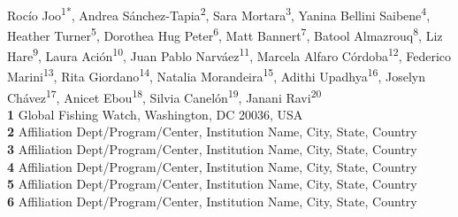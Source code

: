 \documentclass[10pt,letterpaper]{article}
\begin{document}
\newcommand{\fede}[1]{\textcolor{ForestGreen}{Fede: #1}}
\newcommand{\rocio}[1]{\textcolor{MidnightBlue}{Rocio: #1}}
\newcommand{\doro}[1]{\textcolor{RedViolet}{Dorothea: #1}}
\newcommand{\jani}[1]{\textcolor{YellowOrange}{Janina: #1}}
\newcommand{\la}[1]{\textcolor{RawSienna}{Laura: #1}}
\newcommand{\as}[1]{\textcolor{Violet}{Andrea: #1}}
\newcommand{\rita}[1]{\textcolor{CarnationPink}{Rita: #1}}

\vspace*{0.2in}

\begin{flushleft}
{\Large
\textbf{} %
}
\newline
\\
Rocío Joo\textsuperscript{1*}, %
Andrea Sánchez-Tapia\textsuperscript{2},
Sara Mortara\textsuperscript{3},
Yanina Bellini Saibene\textsuperscript{4},
Heather Turner\textsuperscript{5}, %
Dorothea Hug Peter\textsuperscript{6}, %
Matt Bannert\textsuperscript{7},
Batool Almazrouq\textsuperscript{8},
Liz Hare\textsuperscript{9},
Laura Ación\textsuperscript{10},
Juan Pablo Narváez\textsuperscript{11},
Marcela Alfaro Córdoba\textsuperscript{12},
Federico Marini\textsuperscript{13},
Rita Giordano\textsuperscript{14},
Natalia Morandeira\textsuperscript{15},
Adithi Upadhya\textsuperscript{16},
Joselyn Chávez\textsuperscript{17\Yinyang},
Anicet Ebou\textsuperscript{18\Yinyang},
Silvia Canelón\textsuperscript{19\Yinyang},
Janani Ravi\textsuperscript{20}
\\
\bigskip
\textbf{1} Global Fishing Watch, Washington, DC 20036, USA
\\
\textbf{2} Affiliation Dept/Program/Center, Institution Name, City, State, Country
\\
\textbf{3} Affiliation Dept/Program/Center, Institution Name, City, State, Country
\\
\textbf{4} Affiliation Dept/Program/Center, Institution Name, City, State, Country
\\
\textbf{5} Affiliation Dept/Program/Center, Institution Name, City, State, Country
\\
\textbf{6} Affiliation Dept/Program/Center, Institution Name, City, State, Country

\end{flushleft}
\end{document}
